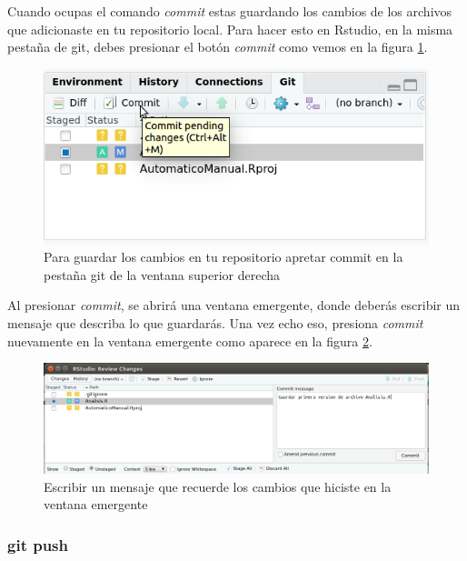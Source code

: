 \documentclass[]{book}
\begin{document}
Cuando ocupas el comando \emph{commit} estas guardando los cambios de
los archivos que adicionaste en tu repositorio local. Para hacer esto en
Rstudio, en la misma pestaña de git, debes presionar el botón
\emph{commit} como vemos en la figura \ref{fig:Commit}.

\begin{figure}

{\centering \includegraphics[width=0.8\linewidth]{Commit} 

}

\caption{Para guardar los cambios en tu repositorio apretar commit en la pestaña git de la ventana superior derecha}\label{fig:Commit}
\end{figure}

Al presionar \emph{commit}, se abrirá una ventana emergente, donde
deberás escribir un mensaje que describa lo que guardarás. Una vez echo
eso, presiona \emph{commit} nuevamente en la ventana emergente como
aparece en la figura \ref{fig:MensajeCommit}.

\begin{figure}

{\centering \includegraphics[width=0.8\linewidth]{MensajeCommit} 

}

\caption{Escribir un mensaje que recuerde los cambios que hiciste en la ventana emergente}\label{fig:MensajeCommit}
\end{figure}

\hypertarget{git-push}{%
\subsubsection{git push}\label{git-push}}
\end{document}
